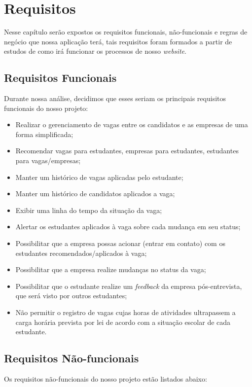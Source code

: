 \chapter{Requisitos}

Nesse capítulo serão expostos os requisitos funcionais, não-funcionais e regras de negócio que nossa aplicação terá, tais requisitos foram formados a partir de estudos de como irá funcionar os processos de nosso \emph{website}.

\section{Requisitos Funcionais}

Durante nossa análise, decidimos que esses seriam os principais requisitos funcionais do nosso projeto:

\begin{itemize}
	\item Realizar o gerenciamento de vagas entre os candidatos e as empresas de uma forma simplificada;
	\item Recomendar vagas para estudantes, empresas para estudantes, estudantes para vagas/empresas;
	\item Manter um histórico de vagas aplicadas pelo estudante;
	\item Manter um histórico de candidatos aplicados a vaga;
	\item Exibir uma linha do tempo da situação da vaga;
	\item Alertar os estudantes aplicados à vaga sobre cada mudança em seu status;
	\item Possibilitar que a empresa possas acionar (entrar em contato) com os estudantes recomendados/aplicados à vaga;
	\item Possibilitar que a empresa realize mudanças no status da vaga;
	\item Possibilitar que o estudante realize um \emph{feedback} da empresa pós-entrevista, que será visto por outros estudantes;
	\item Não permitir o registro de vagas cujas horas de atividades ultrapassem a carga horária prevista por lei de acordo com a situação escolar de cada estudante.
\end{itemize}

\section{Requisitos Não-funcionais}

Os requisitos não-funcionais do nosso projeto estão listados abaixo:

